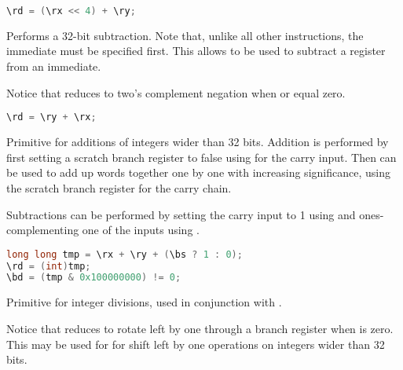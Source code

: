 \begin{lstlisting}[numbers=none, basicstyle=\ttfamily\footnotesize, language=C++]
\rd = (\rx << 4) + \ry;
\end{lstlisting}

Performs a 32-bit subtraction. Note that, unlike all other instructions, the
immediate must be specified first. This allows  to be used to subtract
a register from an immediate.

Notice that  reduces to two's complement negation when  or
 equal zero.

\begin{lstlisting}[numbers=none, basicstyle=\ttfamily\footnotesize, language=C++]
\rd = \ry + \rx;
\end{lstlisting}

Primitive for additions of integers wider than 32 bits. Addition is performed by
first setting a scratch branch register to false using  for the carry
input. Then  can be used to add up words together one by one with
increasing significance, using the scratch branch register for the carry chain.

Subtractions can be performed by setting the carry input to 1 using 
and ones-complementing one of the inputs using .

\begin{lstlisting}[numbers=none, basicstyle=\ttfamily\footnotesize, language=C++]
long long tmp = \rx + \ry + (\bs ? 1 : 0);
\rd = (int)tmp;
\bd = (tmp & 0x100000000) != 0;
\end{lstlisting}

Primitive for integer divisions, used in conjunction with .

Notice that  reduces to rotate left by one through a branch register
when  is zero. This may be used for for shift left by one
operations on integers wider than 32 bits.

